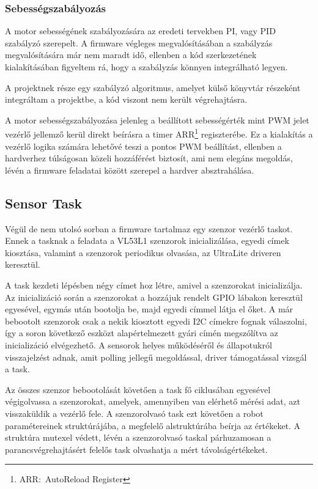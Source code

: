 \subsubsection{Sebességszabályozás}

A motor sebességének szabályozására az eredeti tervekben PI, vagy PID szabályzó
szerepelt. A firmware végleges megvalósításában a szabályzás megvalósítására már
nem maradt idő, ellenben a kód szerkezetének kialakításában figyeltem rá, hogy a
szabályzás könnyen integrálható legyen.

A projektnek része egy szabályzó algoritmus, amelyet külső könyvtár
részeként integráltam a projektbe, a kód viszont nem került
végrehajtásra.


A motor sebességszabályozása jelenleg a beállított sebességérték mint PWM jelet
vezérlő jellemző kerül direkt beírásra a timer ARR\footnote{ARR:~AutoReload Register}
regiszterébe. Ez a kialakítás a vezérlő logika számára lehetővé teszi a pontos
PWM beállítást, ellenben a hardverhez túlságosan közeli hozzáférést biztosít, ami
nem elegáns megoldás, lévén a firmware feladatai között szerepel a hardver
absztrahálása.

\subsection{Sensor Task}

Végül de nem utolsó sorban a firmware tartalmaz egy szenzor vezérlő taskot. Ennek
a tasknak a feladata a VL53L1 szenzorok inicializálása, egyedi címek kiosztása,
valamint a szenzorok periodikus olvasása, az UltraLite driveren keresztül.

\medskip

A task kezdeti lépésben négy címet hoz létre, amivel a szenzorokat
inicializálja. Az inicializáció során a szenzorokat a hozzájuk rendelt GPIO
lábakon keresztül egyesével, egymás után bootolja be, majd egyedi címmel látja el
őket. A már bebootolt szenzorok csak a nekik kiosztott egyedi I2C címekre fognak
válaszolni, így a soron következő eszközt alapértelmezett gyári címén megszólítva
az inicializáció elvégezhető. A sensorok helyes működéséről és állapotukról
visszajelzést adnak, amit polling jellegű megoldással, driver támogatással
vizsgál a task.

Az összes szenzor bebootolását követően a task fő ciklusában egyesével
végigolvassa a szenzorokat, amelyek, amennyiben van elérhető mérési adat, azt
visszaküldik a vezérlő fele. A szenzorolvasó task ezt követően a robot
paramétereinek struktúrájába, a megfelelő alstruktúrába beírja az értékeket. A
struktúra mutexel védett, lévén a szenzorolvasó taskal párhuzamosan a
parancsvégrehajtásért felelős task olvashatja a mért távolságértékeket. 

